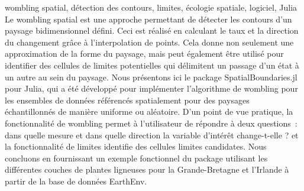 \maketitle
\begin{refsection}

\begin{resume}{wombling spatial, détection des contours, limites, écologie spatiale, logiciel, Julia} Le wombling spatial est une approche permettant de détecter les contours d’un paysage bidimensionnel défini. Ceci est réalisé en calculant le taux et la direction du changement grâce à l’interpolation de points. Cela donne non seulement une approximation de la forme du paysage, mais peut également être utilisé pour identifier des cellules de limites potentielles qui délimitent un passage d'un état à un autre au sein du paysage. Nous présentons ici le package SpatialBoundaries.jl pour Julia, qui a été développé pour implémenter l'algorithme de wombling pour les ensembles de données référencés spatialement pour des paysages échantillonnés de manière uniforme ou aléatoire. D'un point de vue pratique, la fonctionnalité de wombling permet à l'utilisateur de répondre à deux questions : dans quelle mesure et dans quelle direction la variable d’intérêt change-t-elle ? et la fonctionnalité de limites identifie des cellules limites candidates. Nous concluons en fournissant un exemple fonctionnel du package utilisant les différentes couches de plantes ligneuses pour la Grande-Bretagne et l'Irlande à partir de la base de données EarthEnv.
\end{resume}

\begin{abstract}{spatial wombling, edge detection, boundaries, spatial ecology, software, Julia} Spatial wombling is an approach for detecting edges within a defined two-dimensional landscape. This is achieved by calculating the rate and direction of change through the interpolation of points. This not only gives an approximation as to the shape of the landscape but can also be used to identify candidate boundaries cells that delimit a shift from one state to another within the landscape. Here we introduce the SpatialBoundaries.jl package for Julia, which has been developed to implement the wombling algorithm for datasets that are spatially referenced for both uniformly or randomly sampled landscapes.From a practical perspective, the wombling functionality allow the user to answer two questions: how much and in which direction does the variable of interest change? and the boundaries functionality identifies candidate boundary cells. We conclude by providing a working example of the package using the various woody plant layers for Britain and Ireland from the EarthEnv database.
\end{abstract}


\end{refsection}
